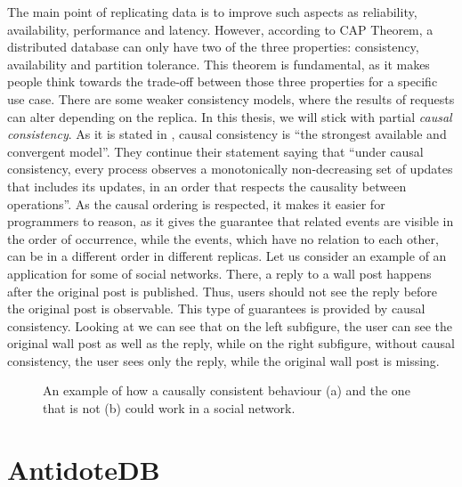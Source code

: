 The main point of replicating data is to improve such aspects as reliability, availability, performance and latency. However, according to CAP Theorem\cite{29}, a distributed database can only have two of the three properties: consistency, availability and partition tolerance. This theorem is fundamental, as it makes people think towards the trade-off between those three properties for a specific use case. There are some weaker consistency models, where the results of requests can alter depending on the replica\cite{28}.  In this thesis, we will stick with partial \textit{causal consistency}. As it is stated in \citet{7}, causal consistency is ``the strongest available and convergent model''. They continue their statement saying that ``under causal consistency, every process observes a monotonically non-decreasing set of updates that includes its updates, in an order that respects the causality between operations''. As the causal ordering is respected, it makes it easier for programmers to reason, as it gives the guarantee that related events are visible in the order of occurrence, while the events, which have no relation to each other, can be in a different order in different replicas. Let us consider an example of an application for some of social networks. There, a reply to a wall post happens after the original post is published. Thus, users should not see the reply before the original post is observable. This type of guarantees is provided by causal consistency. Looking at  we can see that on the left subfigure, the user can see the original wall post as well as the reply, while on the right subfigure, without causal consistency, the user sees only the reply, while the original wall post is missing. 

\begin{figure}%
    \centering
    \def\svgwidth{0.4\linewidth}
    \subfloat[]{{}}%
    \qquad
    \def\svgwidth{0.4\linewidth}
    \subfloat[]{{}}%
    \caption{An example of how a causally consistent behaviour (a) and the one that is not (b) could work in a social network.}%
    \label{fig:theory3}%
\end{figure}





\section{AntidoteDB}
\label{2-antidotedb}

